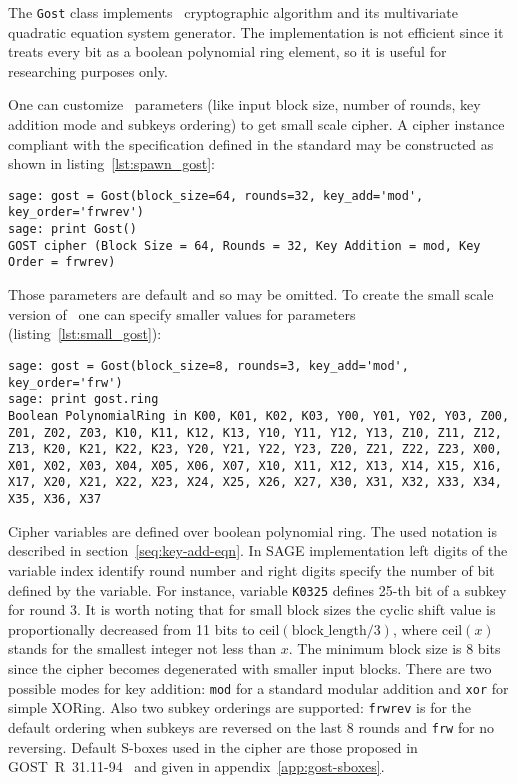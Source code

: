The \verb+Gost+ class implements \gost\ cryptographic algorithm and its
multivariate quadratic equation system generator. The implementation is not
efficient since it treats every bit as a boolean polynomial ring element, so it
is useful for researching purposes only.

One can customize \gost\ parameters (like input block size, number of rounds, key
addition mode and subkeys ordering) to get small scale cipher. A cipher instance
compliant with the specification defined in the standard may be constructed as
shown in listing~\ref{lst:spawn_gost}:
\begin{lstlisting}[label=lst:spawn_gost, caption=Creating GOST instance]
sage: gost = Gost(block_size=64, rounds=32, key_add='mod', key_order='frwrev')
sage: print Gost()
GOST cipher (Block Size = 64, Rounds = 32, Key Addition = mod, Key Order = frwrev)
\end{lstlisting}
Those parameters are default and so may be omitted. To create the small scale
version of \gost\ one can specify smaller values for parameters
(listing~\ref{lst:small_gost}):
\begin{lstlisting}[label=lst:small_gost, caption=Small scale GOST]
sage: gost = Gost(block_size=8, rounds=3, key_add='mod', key_order='frw')
sage: print gost.ring
Boolean PolynomialRing in K00, K01, K02, K03, Y00, Y01, Y02, Y03, Z00, Z01, Z02, Z03, K10, K11, K12, K13, Y10, Y11, Y12, Y13, Z10, Z11, Z12, Z13, K20, K21, K22, K23, Y20, Y21, Y22, Y23, Z20, Z21, Z22, Z23, X00, X01, X02, X03, X04, X05, X06, X07, X10, X11, X12, X13, X14, X15, X16, X17, X20, X21, X22, X23, X24, X25, X26, X27, X30, X31, X32, X33, X34, X35, X36, X37
\end{lstlisting}

Cipher variables are defined over boolean polynomial ring. The used notation
is described in section~\ref{seq:key-add-eqn}. In SAGE implementation left digits of the variable index
identify round number and right digits specify the number of bit defined by the
variable. For instance, variable \verb+K0325+ defines 25-th bit of a subkey for round 3. It is
worth noting that for small block sizes the cyclic shift value is
proportionally decreased from 11 bits to
$\text{ceil}(\text{block\_length} / 3)$,
where $\text{ceil}(x)$ stands for the smallest integer not less than $x$. The
minimum block size is 8 bits since the cipher becomes degenerated with smaller
input blocks.
There are two possible modes for key addition: \verb+mod+ for a standard modular
addition and \verb+xor+ for simple XORing. Also two subkey orderings are
supported: \verb+frwrev+ is for the default ordering when subkeys are reversed on
the last 8 rounds and \verb+frw+ for no reversing. Default S-boxes used in the
cipher are those proposed in GOST~R~31.11-94~\cite{GOST3411} and given in
appendix~\ref{app:gost-sboxes}.

